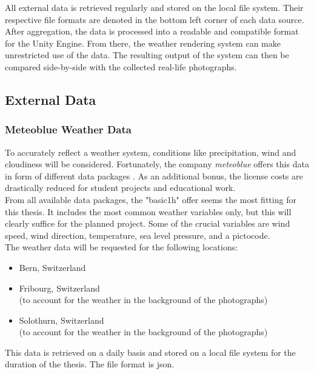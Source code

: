 \noindent
All external data is retrieved regularly and stored on the local file system. Their respective file formats are denoted in the bottom left corner of each data source.
After aggregation, the data is processed into a readable and compatible format for the Unity Engine. From there, the weather rendering system can make unrestricted use of the data.
The resulting output of the system can then be compared side-by-side with the collected real-life photographs.

\subsection{External Data}
\subsubsection{Meteoblue Weather Data}
To accurately reflect a weather system, conditions like precipitation, wind and cloudiness will be considered.
Fortunately, the company \emph{meteoblue} offers this data in form of different data packages \cite{meteoblue}.
As an additional bonus, the license costs are drastically reduced for student projects and educational work.
\\
From all available data packages, the "basic\textunderscore1h" \cite{meteoblue:basic1h} offer seems the most fitting for this thesis.
It includes the most common weather variables only, but this will clearly suffice for the planned project.
Some of the crucial variables are wind speed, wind direction, temperature, sea level pressure, and a pictocode.
\\
The weather data will be requested for the following locations:
\begin{itemize}
    \item Bern, Switzerland
    \item Fribourg, Switzerland \\(to account for the weather in the background of the photographs)
    \item Solothurn, Switzerland \\(to account for the weather in the background of the photographs)
\end{itemize}

\noindent
This data is retrieved on a daily basis and stored on a local file system for the duration of the thesis. The file format is \gls{json}.

